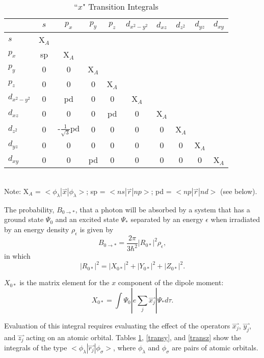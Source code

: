 \begin{table}
\caption{\label{transx} ``$x$" Transition Integrals}
\begin{center}
\begin{tabular}{l|ccccccccc} \hline
& $s$  &  $p_x$  &  $p_y$  &  $p_z$  &  $d_{x^2-y^2}$  & $d_{xz}$  &
$d_{z^2}$  &  $d_{yz}$  &  $d_{xy}$ \\ \hline
$s$ & X$_A$\\
$p_x$ & sp & X$_A$\\
$p_y$  & 0 & 0 & X$_A$ \\
$p_z$  & 0 & 0 & 0 & X$_A$\\
$d_{x^2-y^2}$ & 0 & pd & 0 & 0 & X$_A$\\
$d_{xz}$      & 0 & 0 & 0 & pd & 0 & X$_A$\\
$d_{z^2}$     & 0 & -$\frac{1}{\sqrt{3}}$pd & 0 & 0 & 0 & 0 & X$_A$\\
$d_{yz}$      & 0 & 0 & 0 & 0 & 0 & 0 & 0 & X$_A$\\
$d_{xy}$      & 0 & 0 & pd & 0 & 0 & 0 & 0 & 0 & X$_A$\\  \hline


\end{tabular}\\
\hspace{-0.3in}Note: X$_A$ = $<\! \phi_{\lambda}|\stackrel{\rightharpoonup}{x}|\phi_{\lambda}\! >$;
sp = $<\! ns|\stackrel{\rightharpoonup}{r}|np\! >$; pd = $<\! np|\stackrel{\rightharpoonup}{r}|nd\! >$ (see below).
\end{center}
\end{table}

The probability, $B_{0\rightarrow *}$, that a photon will be absorbed by a system that has a
ground state $\Psi_0$ and an excited state $\Psi_*$ separated by an energy $\epsilon$ when
irradiated by an energy density $\rho_{\epsilon}$
is given by
$$
B_{0\rightarrow *} = \frac{2\pi}{3\hbar^2}|R_{0*}|^2\rho_{\epsilon},
$$
in which
$$
|R_{0*}|^2 = |X_{0*}|^2 + |Y_{0*}|^2 + |Z_{0*}|^2.
$$

$X_{0*}$ is the matrix element for the $x$ component of the dipole moment:
$$
X_{0*} = \int \Psi_0|e\sum_j \stackrel{\rightharpoonup}{x_j} |\Psi_* d\tau.
$$

Evaluation of this integral requires evaluating the effect of the operators  $\stackrel{\rightharpoonup}{x_j}$,
$\stackrel{\rightharpoonup}{y_j}$, and $\stackrel{\rightharpoonup}{z_j}$
acting on an atomic orbital.  Tables \ref{transx}, \ref{transy}, and \ref{transz} show
the integrals of the type $<\! \phi_{\lambda}
 |\stackrel{\rightharpoonup}{r_j}|\phi_{\sigma}\!>$, where $\phi_{\lambda}$ and $\phi_{\sigma}$ are
 pairs of atomic orbitals.


